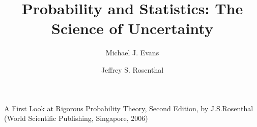 \documentclass[a4paper]{book}
\title{Probability and Statistics: The Science of Uncertainty}
\author{Michael J. Evans \and Jeffrey S. Rosenthal}
\begin{document}
\maketitle
\dominitoc

\frontmatter
\tableofcontents



\mainmatter














\appendix
\begin{appendices}





\end{appendices}

\printindex

\begin{thebibliography}{99}
    A First Look at Rigorous Probability Theory, Second Edition, by J.S.Rosenthal (World Scientific
    Publishing, Singapore, 2006)
\end{thebibliography}


\listoftodos
\todototoc
\end{document}
